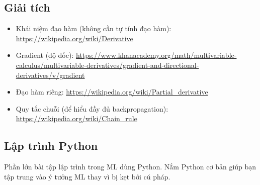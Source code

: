 \documentclass[12pt,a4paper]{article}
\newcommand{\mlccurl}[1]{\url{#1}}
\begin{document}
\subsection{Giải tích}

\begin{luuy}[title={Giải tích (cho chủ đề nâng cao)}]
\begin{itemize}
  \item Khái niệm đạo hàm (không cần tự tính đạo hàm):
  \mlccurl{https://wikipedia.org/wiki/Derivative}
  \item Gradient (độ dốc):
  \mlccurl{https://www.khanacademy.org/math/multivariable-calculus/multivariable-derivatives/gradient-and-directional-derivatives/v/gradient}
  \item Đạo hàm riêng:
  \mlccurl{https://wikipedia.org/wiki/Partial_derivative}
  \item Quy tắc chuỗi (để hiểu đầy đủ backpropagation):
  \mlccurl{https://wikipedia.org/wiki/Chain_rule}
\end{itemize}
\end{luuy}

\subsection{Lập trình Python}

\begin{dongco}[title={Bài tập dùng Python}]
Phần lớn bài tập lập trình trong ML dùng Python. Nắm Python cơ bản giúp bạn tập trung vào ý tưởng ML thay vì bị kẹt bởi cú pháp.
\end{dongco}
\end{document}
